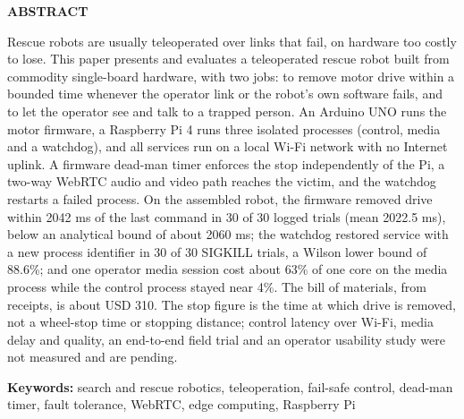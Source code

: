 \clearpage
\thispagestyle{plain}


\begin{center}
    \textbf{\Large ABSTRACT}
\end{center}

\vspace{0.5cm}

Rescue robots are usually teleoperated over links that fail, on hardware too costly to lose. This paper presents and evaluates a teleoperated rescue robot built from commodity single-board hardware, with two jobs: to remove motor drive within a bounded time whenever the operator link or the robot's own software fails, and to let the operator see and talk to a trapped person. An Arduino UNO runs the motor firmware, a Raspberry Pi 4 runs three isolated processes (control, media and a watchdog), and all services run on a local Wi-Fi network with no Internet uplink. A firmware dead-man timer enforces the stop independently of the Pi, a two-way WebRTC audio and video path reaches the victim, and the watchdog restarts a failed process. On the assembled robot, the firmware removed drive within 2042 ms of the last command in 30 of 30 logged trials (mean 2022.5 ms), below an analytical bound of about 2060 ms; the watchdog restored service with a new process identifier in 30 of 30 SIGKILL trials, a Wilson lower bound of 88.6\%; and one operator media session cost about 63\% of one core on the media process while the control process stayed near 4\%. The bill of materials, from receipts, is about USD 310. The stop figure is the time at which drive is removed, not a wheel-stop time or stopping distance; control latency over Wi-Fi, media delay and quality, an end-to-end field trial and an operator usability study were not measured and are pending.

\vspace{0.5cm}
\noindent\textbf{Keywords:} search and rescue robotics, teleoperation, fail-safe control, dead-man timer, fault tolerance, WebRTC, edge computing, Raspberry Pi